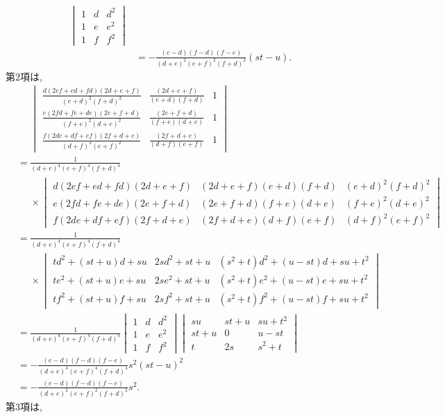 \begin{prf*}
\begin{align*}
\begin{vmatrix}
1&d&d^2\\
1&e&e^2\\
1&f&f^2
\end{vmatrix}\\
&=-\frac{(e-d)(f-d)(f-e)}{(d+e)^2(e+f)^2(f+d)^2}(st-u).
\end{align*}
%
第$2$項は,
\begin{align*}
&\phantom{{}={}}\begin{vmatrix}
\frac{d(2ef+ed+fd)(2d+e+f)}{(e+d)^2(f+d)^2}&\frac{(2d+e+f)}{(e+d)(f+d)}&1\\
\frac{e(2fd+fe+de)(2e+f+d)}{(f+e)^2(d+e)^2}&\frac{(2e+f+d)}{(f+e)(d+e)}&1\\
\frac{f(2de+df+ef)(2f+d+e)}{(d+f)^2(e+f)^2}&\frac{(2f+d+e)}{(d+f)(e+f)}&1
\end{vmatrix}\\
&=\frac{1}{(d+e)^4(e+f)^4(f+d)^4}\\
&\phantom{{}={}}\times\begin{vmatrix}
d(2ef+ed+fd)(2d+e+f)&(2d+e+f)(e+d)(f+d)&(e+d)^2(f+d)^2\\
e(2fd+fe+de)(2e+f+d)&(2e+f+d)(f+e)(d+e)&(f+e)^2(d+e)^2\\
f(2de+df+ef)(2f+d+e)&(2f+d+e)(d+f)(e+f)&(d+f)^2(e+f)^2
\end{vmatrix}\\
&=\frac{1}{(d+e)^4(e+f)^4(f+d)^4}\\
&\phantom{{}={}}\times\begin{vmatrix}
td^2+(st+u)d+su&2sd^2+st+u&(s^2+t)d^2+(u-st)d+su+t^2\\
te^2+(st+u)e+su&2se^2+st+u&(s^2+t)e^2+(u-st)e+su+t^2\\
tf^2+(st+u)f+su&2sf^2+st+u&(s^2+t)f^2+(u-st)f+su+t^2
\end{vmatrix}\\
&=\frac{1}{(d+e)^4(e+f)^4(f+d)^4}
\begin{vmatrix}
1&d&d^2\\
1&e&e^2\\
1&f&f^2
\end{vmatrix}
\begin{vmatrix}
su&st+u&su+t^2\\
st+u&0&u-st\\
t&2s&s^2+t
\end{vmatrix}\\
&=-\frac{(e-d)(f-d)(f-e)}{(d+e)^4(e+f)^4(f+d)^4}s^2(st-u)^2\\
&=-\frac{(e-d)(f-d)(f-e)}{(d+e)^2(e+f)^2(f+d)^2}s^2.
\end{align*}
%
第$3$項は,
\begin{align*}

\end{align*}
\end{prf*}
